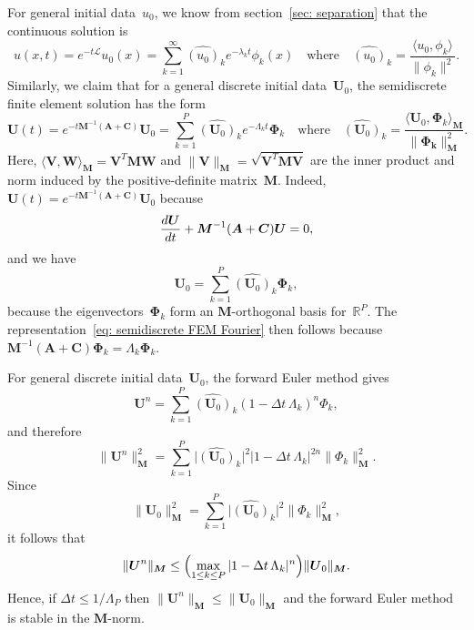 For general initial data~$u_0$, we know from section~\ref{sec: separation} 
that the continuous solution is
\[
u(x,t)=e^{-t\mathcal{L}}u_0(x)
    =\sum_{k=1}^\infty\widehat{(u_0)}_k e^{-\lambda_kt}\phi_k(x)
\quad\text{where}\quad
\widehat{(u_0)}_k=\frac{\langle u_0,\phi_k\rangle}{\|\phi_k\|^2}.
\]
Similarly, we claim that for a general discrete initial
data~$\boldsymbol{U}_0$, the semidiscrete finite element solution has the form
\begin{equation}\label{eq: semidiscrete FEM Fourier}
\boldsymbol{U}(t)=e^{-t\boldsymbol{M}^{-1}(\boldsymbol{A}+\boldsymbol{C})}
    \boldsymbol{U}_0
    =\sum_{k=1}^P\widehat{(\boldsymbol{U}_0)}_k e^{-\Lambda_kt}
    \boldsymbol{\Phi}_k
\quad\text{where}\quad
\widehat{(\boldsymbol{U}_0)}_k
=\frac{\langle\boldsymbol{U}_0,\boldsymbol{\Phi}_k\rangle_{\boldsymbol{M}}}%
{\|\boldsymbol{\Phi_k}\|_{\boldsymbol{M}}^2}.
\end{equation}
Here, $\langle\boldsymbol{V},\boldsymbol{W}\rangle_{\boldsymbol{M}}
=\boldsymbol{V}^T\boldsymbol{M}\boldsymbol{W}$ and 
$\|\boldsymbol{V}\|_{\boldsymbol{M}}
=\sqrt{\boldsymbol{V}^T\boldsymbol{M}\boldsymbol{V}}$ are the inner product and 
norm induced by the positive-definite matrix~$\boldsymbol{M}$.  Indeed, 
$\boldsymbol{U}(t)=e^{-t\boldsymbol{M}^{-1}(\boldsymbol{A}+\boldsymbol{C})}
\boldsymbol{U}_0$ because
\[
\frac{d\boldsymbol{U}}{dt}+\boldsymbol{M}^{-1}(\boldsymbol{A}+\boldsymbol{C})
\boldsymbol{U}=\boldmath{0},
\]
and we have
\[
\boldsymbol{U}_0=\sum_{k=1}^P\widehat{(\boldsymbol{U}_0)}_k\boldsymbol{\Phi}_k,
\]
because the eigenvectors~$\boldsymbol{\Phi}_k$ form an 
$\boldsymbol{M}$-orthogonal basis for~$\mathbb{R}^P$.  The 
representation~\eqref{eq: semidiscrete FEM Fourier} then follows because
$\boldsymbol{M}^{-1}(\boldsymbol{A}+\boldsymbol{C})\boldsymbol{\Phi}_k
=\Lambda_k\boldsymbol{\Phi}_k$.

\begin{example}\label{example: forward Euler FEM}
For general discrete initial data~$\boldsymbol{U}_0$, the forward Euler method 
gives
\[
\boldsymbol{U}^n=\sum_{k=1}^P\widehat{(\boldsymbol{U}_0)}_k 
    (1-\Delta t\,\Lambda_k)^n\Phi_k,
\]
and therefore
\[
\|\boldsymbol{U}^n\|_{\boldsymbol{M}}^2
    =\sum_{k=1}^P\bigl|\widehat{(\boldsymbol{U}_0)}_k\bigr|^2
    |1-\Delta t\,\Lambda_k|^{2n}\|\Phi_k\|_{\boldsymbol{M}}^2.
\]
Since
\[
\|\boldsymbol{U}_0\|_{\boldsymbol{M}}^2
    =\sum_{k=1}^P\bigl|\widehat{(\boldsymbol{U}_0)}_k\bigr|^2
    \|\Phi_k\|_{\boldsymbol{M}}^2,
\]
it follows that
\[
\|\boldsymbol{U}^n\|_{\boldsymbol{M}}
    \le\Bigl(\max_{1\le k\le P}|1-\Delta t\,\Lambda_k|^n\Bigr)
    \|\boldsymbol{U}_0\|_{\boldsymbol{M}}.
\]
Hence, if $\Delta t\le 1/\Lambda_P$ then $\|\boldsymbol{U}^n\|_{\boldsymbol{M}}
\le\|\boldsymbol{U}_0\|_{\boldsymbol{M}}$ and the forward Euler method is 
stable in the $\boldsymbol{M}$-norm.
\end{example}

